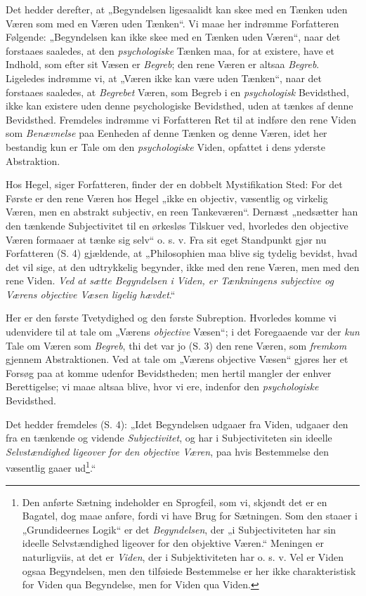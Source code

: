 \documentclass[12pt,a4paper]{book}
\newcommand{\opage}[1]{\marginnote{\footnotesize\textit{[#1]}}}
\begin{document}
Det hedder derefter, at „Begyndelsen ligesaalidt
kan skee med en Tænken uden Væren som med en
Væren uden Tænken“. Vi maae her indrømme Forfatteren
Følgende: „Begyndelsen kan ikke skee med en
Tænken uden Væren“, naar det forstaaes saaledes, at
den \emph{psychologiske} Tænken maa, for at existere, have
et Indhold, som efter sit Væsen er \emph{Begreb}; den rene
Væren er altsaa \emph{Begreb}. Ligeledes indrømme vi, at
„Væren ikke kan være uden Tænken“, naar det forstaaes
saaledes, at \emph{Begrebet} Væren, som Begreb i en \emph{psychologisk}
Bevidsthed, ikke kan existere uden denne psychologiske
Bevidsthed, uden at tænkes af denne Bevidsthed.
Fremdeles indrømme vi Forfatteren Ret til at indføre
den rene Viden som \emph{Benævnelse} paa Eenheden af
denne Tænken og denne Væren, idet her bestandig kun er
Tale om den \emph{psychologiske} Viden, opfattet i dens
yderste Abstraktion.

Hos Hegel, siger Forfatteren, finder der en dobbelt
Mystifikation Sted: For det Første er den rene Væren
hos Hegel „ikke en objectiv, væsentlig og virkelig Væren,
\opage{61}\setcounter{footnote}{0}%
men en abstrakt subjectiv, en reen Tankeværen“. Dernæst
„nedsætter han den tænkende Subjectivitet til en
ørkesløs Tilskuer ved, hvorledes den objective Væren
formaaer at tænke sig selv“ o. s. v. Fra sit eget
Standpunkt gjør nu Forfatteren (S. 4) gjældende, at
„Philosophien maa blive sig tydelig bevidst, hvad det
vil sige, at den udtrykkelig begynder, ikke med den rene
Væren, men med den rene Viden. \emph{Ved at sætte Begyndelsen
i Viden, er Tænkningens subjective
og Værens objective Væsen ligelig hævdet}.“

Her er den første Tvetydighed og den første Subreption.
Hvorledes komme vi udenvidere til at tale
om „Værens \emph{objective} Væsen“; i det Foregaaende
var der \emph{kun} Tale om Væren som \emph{Begreb}, thi det
var jo (S. 3) den rene Væren, som \emph{fremkom} gjennem
Abstraktionen. Ved at tale om „Værens objective
Væsen“ gjøres her et Forsøg paa at komme udenfor
Bevidstheden; men hertil mangler der enhver Berettigelse;
vi maae altsaa blive, hvor vi ere, indenfor den \emph{psychologiske}
Bevidsthed.

Det hedder fremdeles (S. 4): „Idet Begyndelsen
udgaaer fra Viden, udgaaer den fra en tænkende og
vidende \emph{Subjectivitet}, og har i Subjectiviteten sin
ideelle \emph{Selvstændighed ligeover for den objective
Væren}, paa hvis Bestemmelse den væsentlig
gaaer ud\footnote{Den anførte Sætning indeholder en Sprogfeil, som vi,
skjøndt det er en Bagatel, dog maae anføre, fordi vi have
Brug for Sætningen. Som den staaer i „Grundideernes
Logik“ er det \emph{Begyndelsen}, der „i Subjectiviteten har sin
ideelle Selvstændighed ligeover for den objektive Væren.“ Meningen
er naturligviis, at det er \emph{Viden}, der i Subjektiviteten
har o. s. v. Vel er Viden ogsaa Begyndelsen, men
den tilføiede Bestemmelse er her ikke charakteristisk for Viden
qua Begyndelse, men for Viden qua Viden.}.“
\end{document}
